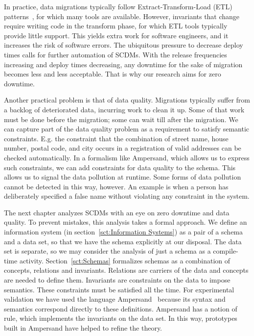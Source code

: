 \documentclass[runningheads]{llncs}
\begin{document}
   In practice, data migrations typically follow Extract-Transform-Load (ETL) patterns~\cite{Theodorou2017},
   for which many tools are available.
   However, invariants that change require writing code in the transform phase,
   for which ETL tools typically provide little support.
   This yields extra work for software engineers, and it increases the risk of software errors.
   The ubiquitous pressure to decrease deploy times calls for further automation of SCDMs.
   With the release frequencies increasing and deploy times decreasing, any downtime for the sake of migration becomes less and less acceptable.
   That is why our research aims for zero downtime.

   Another practical problem is that of data quality.
   Migrations typically suffer from a backlog of deteriorated data, incurring work to clean it up.
   Some of that work must be done before the migration; some can wait till after the migration.
   We can capture part of the data quality problem as a requirement to satisfy semantic constraints.
   E.g. the constraint that the combination of street name, house number, postal code, and city occurs in
   a registration of valid addresses can be checked automatically.
   In a formalism like Ampersand, which allows us to express such constraints, we can add constraints for data quality to the schema.
   This allows us to signal the data pollution at runtime.
   Some forms of data pollution cannot be detected in this way, however.
   An example is when a person has deliberately specified a false name without violating any constraint in the system.

   The next chapter analyzes SCDMs with an eye on zero downtime and data quality.
   To prevent mistakes, this analysis takes a formal approach.
   We define an information system (in section~\ref{sct:Information Systems}) as a pair of a schema and a data set,
   so that we have the schema explicitly at our disposal.
   The data set is separate, so we may consider the analysis of just a schema as a compile-time activity.
   Section~\ref{sct:Schemas} formalizes schemas as a combination of concepts, relations and invariants.
   Relations are carriers of the data and concepts are needed to define them.
   Invariants are constraints on the data to impose semantics.
   These constraints must be satisfied all the time.
   For experimental validation we have used the language Ampersand~\cite{JoostenRAMiCS2017,Joosten-JLAMP2018}
   because its syntax and semantics correspond directly to these definitions.
   Ampersand has a notion of rule, which implements the invariants on the data set.
   In this way, prototypes built in Ampersand have helped to refine the theory.
\end{document}
